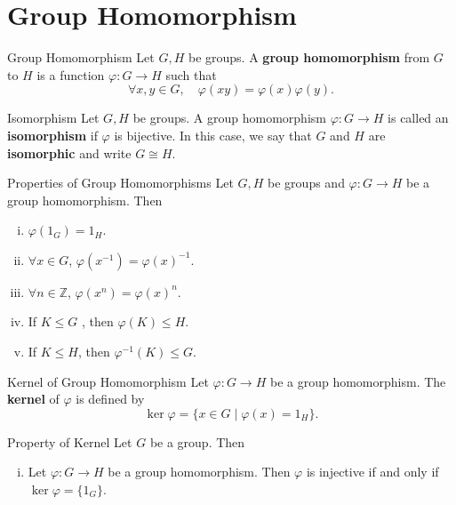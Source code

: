 \section{Group Homomorphism}
\begin{definition}{Group Homomorphism}{}
    Let $G,H$ be groups. A \textbf{group homomorphism} from $G$ to $H$ is a function $\varphi:G\to H$ such that
    \[
        \forall x,y\in G,\quad \varphi(x y)=\varphi(x)\varphi(y).
    \]
\end{definition}

\begin{definition}{Isomorphism}{}
    Let $G,H$ be groups. A group homomorphism $\varphi:G\to H$ is called an \textbf{isomorphism} if $\varphi$ is bijective. In this case, we say that $G$ and $H$ are \textbf{isomorphic} and write $G\cong H$.
\end{definition}

\begin{proposition}{Properties of Group Homomorphisms}{}
    Let $G,H$ be groups and $\varphi:G\to H$ be a group homomorphism. Then
    \begin{enumerate}[(i)]
        \item $\varphi(1_G)=1_H$.
        \item $\forall x\in G$, $\varphi(x^{-1})=\varphi(x)^{-1}$.
        \item $\forall n\in\mathbb{Z}$, $\varphi(x^n)=\varphi(x)^n$.
        \item If $K\le G$ , then $\varphi(K)\le H$.
        \item If $K\le H$, then $\varphi^{-1}(K)\le G$.
    \end{enumerate}
\end{proposition}

\begin{definition}{Kernel of Group Homomorphism}{}
    Let $\varphi:G\to H$ be a group homomorphism. The \textbf{kernel} of $\varphi$ is defined by
    \[
        \ker\varphi=\{x\in G\mid \varphi(x)=1_H\}.
    \]
\end{definition}

\begin{proposition}{Property of Kernel}{}
    Let $G$ be a group. Then
    \begin{enumerate}[(i)]
        \item Let $\varphi:G\to H$ be a group homomorphism. Then $\varphi$ is injective if and only if $\ker\varphi=\{1_G\}$.
    \end{enumerate}
\end{proposition}


